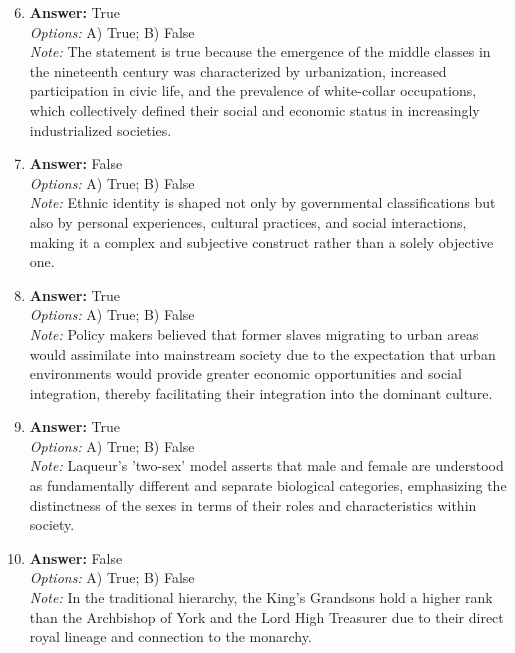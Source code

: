 \documentclass[12pt]{article}
\begin{document}
\begin{enumerate}[label=\arabic*.]
\setcounter{enumi}{5}
\item \textbf{Answer:} True
\\ \textit{Options:} A) True; B) False
\\ \textit{Note:} The statement is true because the emergence of the middle classes in the nineteenth century was characterized by urbanization, increased participation in civic life, and the prevalence of white-collar occupations, which collectively defined their social and economic status in increasingly industrialized societies.
\item \textbf{Answer:} False
\\ \textit{Options:} A) True; B) False
\\ \textit{Note:} Ethnic identity is shaped not only by governmental classifications but also by personal experiences, cultural practices, and social interactions, making it a complex and subjective construct rather than a solely objective one.
\item \textbf{Answer:} True
\\ \textit{Options:} A) True; B) False
\\ \textit{Note:} Policy makers believed that former slaves migrating to urban areas would assimilate into mainstream society due to the expectation that urban environments would provide greater economic opportunities and social integration, thereby facilitating their integration into the dominant culture.
\item \textbf{Answer:} True
\\ \textit{Options:} A) True; B) False
\\ \textit{Note:} Laqueur's 'two-sex' model asserts that male and female are understood as fundamentally different and separate biological categories, emphasizing the distinctness of the sexes in terms of their roles and characteristics within society.
\item \textbf{Answer:} False
\\ \textit{Options:} A) True; B) False
\\ \textit{Note:} In the traditional hierarchy, the King's Grandsons hold a higher rank than the Archbishop of York and the Lord High Treasurer due to their direct royal lineage and connection to the monarchy.
\end{enumerate}
\end{document}
